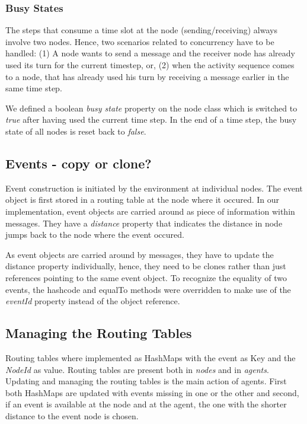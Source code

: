 \documentclass[a4paper,11pt,twoside]{article}
\begin{document}
\subsubsection{Busy States}
The steps that consume a time slot at the node (sending/receiving)
always involve two nodes. Hence, two scenarios related to concurrency
have to be handled: (1) A node wants to send a message and the
receiver node has already used its turn for the current timestep, or,
(2) when the activity sequence comes to a node, that has already used
his turn by receiving a message earlier in the same time step.

We defined a boolean \textit{busy state} property on the node class
which is switched to \textit{true} after having used the current time
step. In the end of a time step, the busy state of all nodes is reset
back to \textit{false}.

\subsection{Events - copy or clone?}
Event construction is initiated by the environment at individual
nodes. The event object is first stored in a routing table at the
node where it occured. In our implementation, event objects are
carried around as piece of information within messages. They have a
\textit{distance} property that indicates the distance in node jumps
back to the node where the event occured.

As event objects are carried around by messages, they have to update
the distance property individually, hence, they need to be clones rather than
just references pointing to the same event object. To recognize the
equality of two events, the hashcode and equalTo methods were
overridden to make use of the \textit{eventId} property instead of the
object reference.

\subsection{Managing the Routing Tables}
Routing tables where implemented as HashMaps with the event as Key and
the \textit{NodeId} as value. Routing tables are present both in \textit{nodes}
and in \textit{agents}. Updating and managing the routing tables
is the main action of agents. First both HashMaps are updated with
events missing in one or the other and second, if an event is
available at the node and at the agent, the one with the shorter
distance to the event node is chosen.
\end{document}
